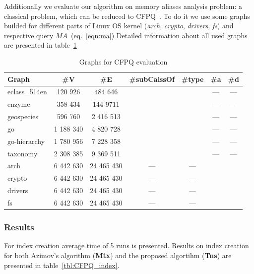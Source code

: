Additionally we evaluate our algorithm on memory aliases analysis problem: a classical problem, which can be reduced to CFPQ~\cite{!!!}.
To do it we use some graphs builded for different parts of Linux OS kernel (\textit{arch}, \textit{crypto}, \textit{drivers}, \textit{fs}) and respective query $MA$~(eq.~\ref{eqn:ma})
Detailed information about all used graphs are presented in table~\ref{tbl:graphs_for_cfpq}
{\setlength{\tabcolsep}{0.2em}
\begin{table}
{
\caption{Graphs for CFPQ evaluation}
\label{tbl:graphs_for_cfpq}
\small
{}
\begin{tabular}{|l|c|c|c|c|c|c|}
\hline
Graph          & \#V       & \#E        & \#subCalssOf & \#type & \#a  & \#d \\
\hline
\hline 
eclass\_514en  & 120 926   & 484 646    &              &        & ---  & --- \\
enzyme         & 358 434   & 144 9711   &              &        & ---  & --- \\
geospecies     & 596 760   & 2 416 513  &              &        & ---  & --- \\
go             & 1 188 340 & 4 820 728  &              &        & ---  & --- \\
go-hierarchy   & 1 780 956 & 7 228 358  &              &        & ---  & --- \\
taxonomy       & 2 308 385 & 9 369 511  &              &        & ---  & --- \\
\hline
arch           & 6 442 630 & 24 465 430 &      ---     &  ---   &      &     \\
crypto         & 6 442 630 & 24 465 430 &      ---     &  ---   &      &     \\
drivers        & 6 442 630 & 24 465 430 &      ---     &  ---   &      &     \\
fs             & 6 442 630 & 24 465 430 &      ---     &  ---   &      &     \\
\hline
\end{tabular}
}
\end{table}
}
\subsubsection{Results}

For index creation average time of 5 runs is presented.
Results on index creation for both Azimov's algorithm (\textbf{Mtx}) and the proposed algortihm (\textbf{Tns}) are presented in table~\ref{tbl:CFPQ_index}.


